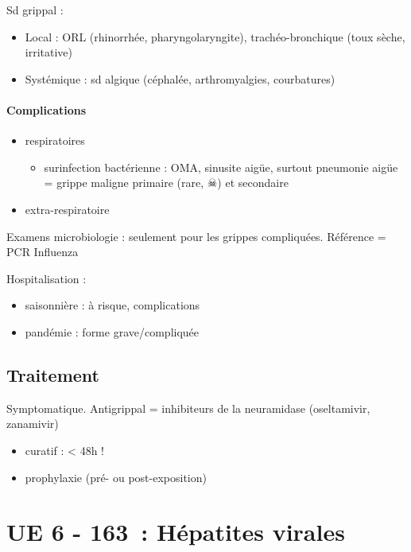 \documentclass{article}
\begin{document}
Sd grippal :
\begin{itemize}
  \item 
    Local : ORL (rhinorrhée, pharyngolaryngite), trachéo-bronchique (toux sèche, irritative)
    \item Systémique : sd algique (céphalée, arthromyalgies, courbatures)
\end{itemize}

\paragraph{Complications}%
\label{par:complications}

\begin{itemize}
  \item respiratoires
    \begin{itemize}
      \item surinfection bactérienne : OMA, sinusite aigüe, surtout pneumonie aigüe =
        grippe maligne primaire (rare, $\skull$) et secondaire
    \end{itemize}
  \item extra-respiratoire
\end{itemize}

Examens microbiologie : seulement pour les grippes compliquées. Référence = PCR
Influenza

Hospitalisation : 
\begin{itemize}
  \item saisonnière : à risque, complications
  \item pandémie : forme grave/compliquée
\end{itemize}

\subsection{Traitement}%

Symptomatique.
Antigrippal = inhibiteurs de la neuramidase (oseltamivir, zanamivir)
\begin{itemize}
  \item curatif : < 48h !
  \item prophylaxie (pré- ou post-exposition)
\end{itemize}

\section{UE 6 - 163 : Hépatites virales}
\end{document}
